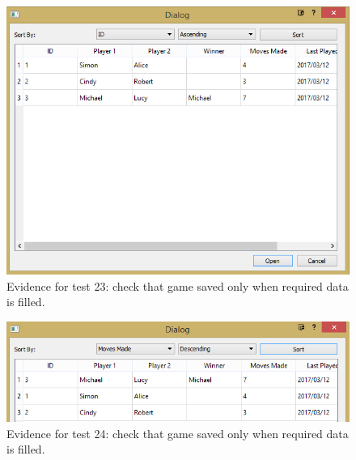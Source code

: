\begin{figure}
	\centering
	\includegraphics[width=1.0\textwidth]{images/screenshots/test-23}
	\caption{Evidence for test 23: check that game saved only when required data is filled.}
	\label{test-23}
\end{figure}
\begin{figure}
	\centering
	\includegraphics[width=1.0\textwidth]{images/screenshots/test-24}
	\caption{Evidence for test 24: check that game saved only when required data is filled.}
	\label{test-24}
\end{figure}